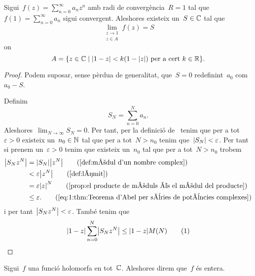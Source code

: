 \documentclass[../Apunts.tex]{subfiles}
\begin{document}
	\begin{theorem}
		\label{thm:Teorema d'Abel per sèries de potències complexes}
		Sigui~\(f(z)=\sum_{n=0}^{\infty}a_{n}z^{n}\) amb radi de convergència~\(R=1\) tal que~\(f(1)=\sum_{n=0}^{\infty}a_{n}\) sigui convergent. Aleshores existeix un~\(S\in\mathbb{C}\) tal que
		\[\lim_{\substack{z\to1\\z\in A}}f(z)=S\]
		on
		\begin{equation}
			\label{eq:1:thm:Teorema d'Abel per sèries de potències complexes}
			A=\{z\in\CC\mid\abs{1-z}<k(1-\abs{z})\text{ per a cert }k\in\RR\}.
		\end{equation}
		\begin{proof}
			Podem suposar, sense pèrdua de generalitat, que~\(S=0\) redefinint~\(a_{0}\) com~\(a_{0}-S\).
			
			Definim
			\[S_{N}=\sum_{n=0}^{N}a_{n}.\]
			Aleshores~\(\lim_{N\to\infty}S_{N}=0\). Per tant, per la definició de~ tenim que per a tot~\(\varepsilon>0\) existeix un~\(n_{0}\in\mathbb{N}\) tal que per a tot~\(N>n_{0}\) tenim que~\(\abs{S_{N}}<\varepsilon\). Per tant si prenem un~\(\varepsilon>0\) tenim que existeix un~\(n_{0}\) tal que per a tot~\(N>n_{0}\) trobem
			\begin{align*}
				\modul{S_{N}z^{N}}&=\modul{S_{N}}\modul{z^{N}} \tag{\ref{def:mòdul d'un nombre complex}} \\
				&<\varepsilon\modul{z^{N}} \tag{\ref{def:límit}} \\
				&=\varepsilon\modul{z}^{N} \tag{\ref{prop:el producte de mòduls és el mòdul del producte}} \\
				&\leq\varepsilon. \tag{\ref{eq:1:thm:Teorema d'Abel per sèries de potències complexes}}
			\end{align*}
			i per tant~\(\modul{S_{N}z^{N}}<\varepsilon\). També tenim que
			\begin{align*}
				\modul{1-z}\sum_{n=0}^{N}\modul{S_{N}z^{N}}\leq\modul{1-z}M(N) \tag{1}
			\end{align*}
		\end{proof}
	\end{theorem}
	\begin{definition}
		\label{def:funció entera}
		Sigui~\(f\) una funció holomorfa en tot~\(\mathbb{C}\). Aleshores direm que~\(f\) és entera.
	\end{definition}
\end{document}
